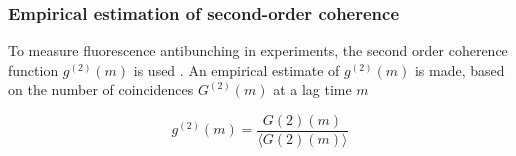 



\subsubsection{Empirical estimation of second-order coherence}

To measure fluorescence antibunching in experiments, the second order coherence function $g^{(2)}(m)$ is used \parencite{Israel2017}. An empirical estimate of $g^{(2)}(m)$ is made, based on the number of coincidences $G^{(2)}(m)$ at a lag time $m$

\begin{equation}
g^{(2)}(m)=\frac{G(2)(m)}{\langle G(2)(m)\rangle }
\end{equation}



